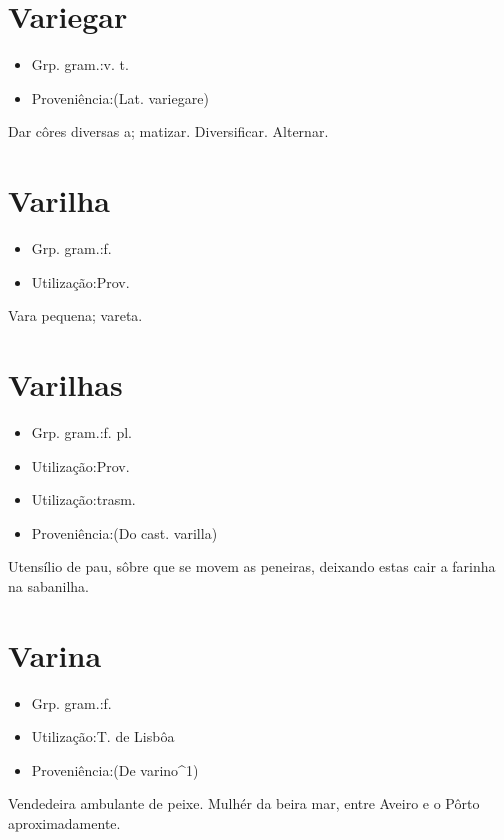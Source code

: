 \documentclass{article}
\begin{document}
\section{Variegar}
\begin{itemize}
\item {Grp. gram.:v. t.}
\end{itemize}
\begin{itemize}
\item {Proveniência:(Lat. \textunderscore variegare\textunderscore )}
\end{itemize}
Dar côres diversas a; matizar.
Diversificar.
Alternar.
\section{Varilha}
\begin{itemize}
\item {Grp. gram.:f.}
\end{itemize}
\begin{itemize}
\item {Utilização:Prov.}
\end{itemize}
Vara pequena; vareta.
\section{Varilhas}
\begin{itemize}
\item {Grp. gram.:f. pl.}
\end{itemize}
\begin{itemize}
\item {Utilização:Prov.}
\end{itemize}
\begin{itemize}
\item {Utilização:trasm.}
\end{itemize}
\begin{itemize}
\item {Proveniência:(Do cast. \textunderscore varilla\textunderscore )}
\end{itemize}
Utensílio de pau, sôbre que se movem as peneiras, deixando estas cair a farinha na sabanilha.
\section{Varina}
\begin{itemize}
\item {Grp. gram.:f.}
\end{itemize}
\begin{itemize}
\item {Utilização:T. de Lisbôa}
\end{itemize}
\begin{itemize}
\item {Proveniência:(De \textunderscore varino\textunderscore ^1)}
\end{itemize}
Vendedeira ambulante de peixe.
Mulhér da beira mar, entre Aveiro e o Pôrto aproximadamente.
\end{document}
